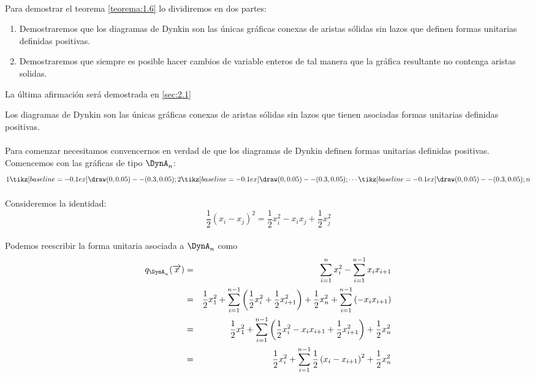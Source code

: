 \paragraph{}
Para demostrar el teorema \ref{teorema:1.6} lo dividiremos en dos partes:
\begin{enumerate}
    \item Demostraremos que los diagramas de Dynkin son las únicas gráficas conexas de aristas sólidas sin lazos que definen formas unitarias definidas positivas.
    \item Demostraremos que siempre es posible hacer cambios de variable enteros de tal manera que la gráfica resultante no contenga aristas solidas.
\end{enumerate}
La última afirmación será demostrada en \ref{sec:2.1}
\begin{lemma}
Los diagramas de Dynkin son las únicas gráficas conexas de aristas sólidas sin lazos que tienen asociadas formas unitarias definidas positivas.
\label{lema:1.7}
\end{lemma}

\newpage
\paragraph{}
Para comenzar necesitamos convencernos en verdad de que los diagramas de Dynkin definen formas unitarias definidas positivas. Comencemos con las gráficas de tipo $\DynA_{n}$:
$$1 \tikz[baseline=-0.1ex]\draw (0,0.05) -- (0.3,0.05); 2 \tikz[baseline=-0.1ex]\draw (0,0.05) -- (0.3,0.05); \cdots \tikz[baseline=-0.1ex]\draw (0,0.05) -- (0.3,0.05); n$$
\paragraph{}
Consideremos la identidad:
\begin{equation*}
    \frac{1}{2}\left(x_{i} - x_{j}\right)^{2} = \frac{1}{2}x_{i}^{2} - x_{i}x_{j} + \frac{1}{2}x_{j}^{2}
\end{equation*}
\paragraph{}
Podemos reescribir la forma unitaria asociada a $\DynA_{n}$ como
\begin{eqnarray*}
 q_{\DynA_{n}}(\overrightarrow{x}) &  =  & \sum_{i=1}^{n}x_{i}^{2} - \sum_{i=1}^{n-1} x_{i}x_{i+1}\\
 &  =  & \frac{1}{2}x_{1}^{2} + \sum_{i=1}^{n-1}\left(\frac{1}{2}x_{i}^{2} + \frac{1}{2} x_{i+1}^{2}\right) + \frac{1}{2}x_{n}^{2} + \sum_{i=1}^{n-1} \left(-x_{i}x_{i+1}\right)\\
 &  =  & \frac{1}{2}x_{1}^{2} + \sum_{i=1}^{n-1}\left(\frac{1}{2}x_{i}^{2} - x_{i}x_{i+1} + \frac{1}{2}x_{i+1}^{2} \right) + \frac{1}{2}x_{n}^{2}\\
 &  =  & \frac{1}{2}x_{i}^{2} + \sum_{i=1}^{n-1}\frac{1}{2}\left(x_{i} - x_{i+1}\right)^{2} + \frac{1}{2}x_{n}^{2}
\end{eqnarray*}
